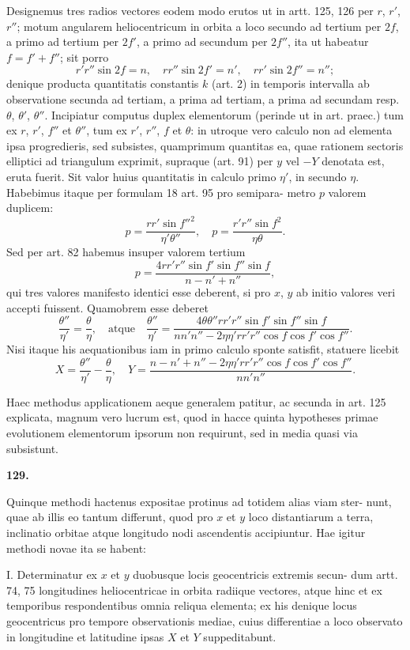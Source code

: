 \documentclass[12pt,a4paper]{article}
\begin{document}
Designemus tres radios vectores eodem modo erutos ut in artt. 125, 126
per $r$, $r'$, $r''$; motum angularem heliocentricum in orbita a loco secundo ad
tertium per $2f$, a primo ad tertium per $2f'$, a primo ad secundum per $2f''$,
ita ut habeatur $f = f' + f''$; sit porro
\[
r'r''\sin 2f = n, \quad rr''\sin 2f' = n', \quad rr'\sin 2f'' = n'';
\]
denique producta quantitatis constantis $k$ (art. 2) in temporis intervalla ab
observatione secunda ad tertiam, a prima ad tertiam, a prima ad secundam
resp. $\theta$, $\theta'$, $\theta''$. Incipiatur computus duplex elementorum (perinde ut in art.
praec.) tum ex $r$, $r'$, $f''$ et $\theta''$, tum ex $r'$, $r''$, $f$ et $\theta$: in utroque vero calculo non
ad elementa ipsa progredieris, sed subsistes, quamprimum quantitas ea, quae
rationem sectoris elliptici ad triangulum exprimit, supraque (art. 91) per $y$ vel
$-Y$ denotata est, eruta fuerit. Sit valor huius quantitatis in calculo primo
$\eta'$, in secundo $\eta$. Habebimus itaque per formulam 18 art. 95 pro semipara-
metro $p$ valorem duplicem:
\[
p = \frac{rr'\sin f''^2}{\eta'\theta''}, \quad p = \frac{r'r''\sin f^2}{\eta\theta}.
\]
Sed per art. 82 habemus insuper valorem tertium
\[
p = \frac{4rr'r''\sin f'\sin f''\sin f}{n - n' + n''},
\]
qui tres valores manifesto identici esse deberent, si pro $x$, $y$ ab initio valores
veri accepti fuissent. Quamobrem esse deberet
\[
\frac{\theta''}{\eta'} = \frac{\theta}{\eta}, \quad \text{atque} \quad
\frac{\theta''}{\eta'} = \frac{4\theta\theta''rr'r''\sin f'\sin f''\sin f}{nn'n'' - 2\eta\eta'rr'r''\cos f\cos f'\cos f''}.
\]
Nisi itaque his aequationibus iam in primo calculo sponte satisfit, statuere
licebit
\[
X = \frac{\theta''}{\eta'} - \frac{\theta}{\eta}, \quad
Y = \frac{n - n' + n'' - 2\eta\eta'rr'r''\cos f\cos f'\cos f''}{nn'n''}.
\]

Haec methodus applicationem aeque generalem patitur, ac secunda in
art. 125 explicata, magnum vero lucrum est, quod in hacce quinta hypotheses
primae evolutionem elementorum ipsorum non requirunt, sed in media quasi
via subsistunt.

\bigskip
\noindent\textbf{129.}

Quinque methodi hactenus expositae protinus ad totidem alias viam ster-
nunt, quae ab illis eo tantum differunt, quod pro $x$ et $y$ loco distantiarum a
terra, inclinatio orbitae atque longitudo nodi ascendentis accipiuntur. Hae
igitur methodi novae ita se habent:

I. Determinatur ex $x$ et $y$ duobusque locis geocentricis extremis secun-
dum artt. 74, 75 longitudines heliocentricae in orbita radiique vectores, atque
hinc et ex temporibus respondentibus omnia reliqua elementa; ex his denique
locus geocentricus pro tempore observationis mediae, cuius differentiae a loco
observato in longitudine et latitudine ipsas $X$ et $Y$ suppeditabunt.
\end{document}
